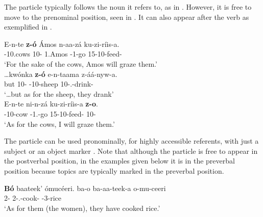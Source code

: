 \documentclass[output=paper]{langscibook}
\begin{document}
The particle typically follows the noun it refers to, as in . However, it is free to move to the prenominal position, seen in . It can also appear after the verb as exemplified in .

\pagebreak
\ea
\label{bkm:Ref111495200} 
\citep[5]{AsiimwevanderWal2021}
\settowidth\jamwidth{[Post-N]}
\ea
\label{bkm:Ref111495200:a}
{\gll
E-n-te  \textbf{z-ó}  \'{A}mos  n-aa-zá  ku-zi-ríis-a.    \\
\AUG{}-{}10.cows  10-\CM{}  1.Amos  \IPFV{}-1\SM{}-{}go  15-10\OM{}-{}feed-\FV{}\\
}\jambox*{[Post-N]}
\glt
‘For the sake of the cows, Amos will graze them.’\\


\ex
\label{bkm:Ref111495200:b}
{\gll
…kwónka  \textbf{z-ó}  e-n-taama  z-áá-nyw-a.    \\
but  10-\CM{}  \AUG{}-{}10-sheep  10\SM{}-\N{}.\PST{}-{}drink-\FV{}\\
}\jambox*{[Pre-N]}
\glt
‘…but as for the sheep, they drank’\\


\ex
\label{bkm:Ref111495200:c}
{\gll
E-n-te  ni-n-zá  ku-zi-ríis-a  \textbf{z-o}.  \\
\AUG{}-{}10-cow  \IPFV{}-1\SG{}.\SM{}-{}go  15-10\OM{}-{}feed-\FV{}  10-\CM{}\\
}\jambox*{[Post-V]}
\glt
‘As for the cows, I will graze them.’\\


\z
\z

The particle can be used pronominally, for highly accessible referents, with just a subject  or an object marker . Note that although the particle is free to appear in the postverbal position, in the examples given  below  it is in the preverbal position because topics are typically marked in the preverbal position.


\ea
\label{bkm:Ref113699913}
\citep[5]{AsiimwevanderWal2021}
\ea
\label{bkm:Ref113699913:a}
\textbf{Bó} baateek’ ómucéeri.    \jambox*{[\CM{} + \SM{}]}
\gll
ba-o  ba-aa-teek-a  o-mu-ceeri\\
2-\CM{}  {}2\SM{}-\N{}.\PST{}-cook-\FV{}  \AUG{}-{}3-rice\\
\glt
‘As for them (the women), they have cooked rice.’\\
\end{document}
